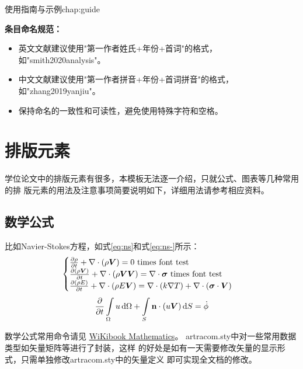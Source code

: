\begin{cuzchapter}{使用指南与示例}{chap:guide}
\begin{leftbar}
        \noindent\textbf{ 条目命名规范：}
        \begin{itemize}
            \item 英文文献建议使用"第一作者姓氏+年份+首词"的格式，如"smith2020analysis"。
            \item 中文文献建议使用"第一作者拼音+年份+首词拼音"的格式，如"zhang2019yanjiu"。
            \item 保持命名的一致性和可读性，避免使用特殊字符和空格。
        \end{itemize}
    \end{leftbar}

    \section{排版元素}\label{sec:elements}

    学位论文中的排版元素有很多，本模板无法逐一介绍，只就公式、图表等几种常用的排
    版元素的用法及注意事项简要说明如下，详细用法请参考相应资料。

    \subsection{数学公式}\label{sub:equations}

    比如Navier-Stokes方程，如式\eqref{eq:ns}和式\eqref{eq:ns-}所示：
    \begin{equation}
        \label{eq:ns}
        \begin{cases}
            \frac{\partial \rho}{\partial t} + \nabla\cdot(\rho\Vector{V}) = 0 \ \mathrm{times\ font\ test}                                            \\
            \frac{\partial (\rho\Vector{V})}{\partial t} + \nabla\cdot(\rho\Vector{V}\Vector{V}) = \nabla\cdot\Tensor{\sigma} \ \text{times font test} \\
            \frac{\partial (\rho E)}{\partial t} + \nabla\cdot(\rho E\Vector{V}) = \nabla\cdot(k\nabla T) + \nabla\cdot(\Tensor{\sigma}\cdot\Vector{V})
        \end{cases}
    \end{equation}
    \begin{equation}
        \label{eq:ns-}
        \frac{\partial }{\partial t}\int\limits_{\Omega} u \, \mathrm{d}\Omega + \int\limits_{S} \boldsymbol{\mathbf{n}}\cdot(u\boldsymbol{V}) \, \mathrm{d}S = \dot{\phi}
    \end{equation}

    数学公式常用命令请见
    \href{https://en.wikibooks.org/wiki/LaTeX/Mathematics}{WiKibook
        Mathematics}。 artracom.sty中对一些常用数据类型如矢量矩阵等进行了封装，这样
    的好处是如有一天需要修改矢量的显示形式，只需单独修改artracom.sty中的矢量定义
    即可实现全文档的修改。


\end{cuzchapter}
